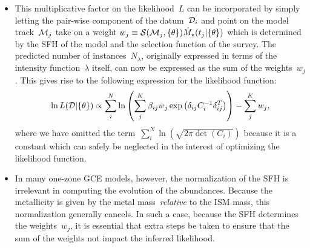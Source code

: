 \documentclass[ms.tex]{subfiles}
\begin{document}
\begin{itemize}
	\item This multiplicative factor on the likelihood~$L$ can be incorporated
	by simply letting the pair-wise component of the datum~$\mathcal{D}_i$ and
	point on the model track~$\mathcal{M}_j$ take on a weight
	$w_j \equiv \mathcal{S}(\mathcal{M}_j, \{\theta\})\dot{M}_\star(t_j |
	\{\theta\})$ which is determined by the SFH of the model and the selection
	function of the survey.
	The predicted number of instances~$N_\lambda$, originally expressed in
	terms of the intensity function~$\lambda$ itself, can now be expressed as
	the sum of the weights~$w_j$.
	This gives rise to the following expression for the likelihood function:
	\begin{equation}
	\ln L(\mathcal{D} | \{\theta\}) \propto
	\sum_i^N \ln \left(
	\sum_j^K \beta_{ij} w_j \exp\left(\delta_{ij} C_i^{-1} \delta_{ij}^T\right)
	\right) - \sum_j^K w_j,
	\label{eq:lnL_withweights}
	\end{equation}
	where we have omitted the term~$\sum_i^N \ln\left(\sqrt{2\pi \det(C_i)}
	\right)$ because it is a constant which can safely be neglected in the
	interest of optimizing the likelihood function.

	\item In many one-zone GCE models, however, the normalization of the SFH is
	irrelevant in computing the evolution of the abundances.
	Because the metallicity is given by the metal mass~\textit{relative} to the
	ISM mass, this normalization generally cancels.
	In such a case, because the SFH determines the weights~$w_j$, it is
	essential that extra steps be taken to ensure that the sum of the weights
	not impact the inferred likelihood.


\end{itemize}
\end{document}
